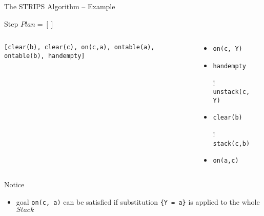 \documentclass[presentation]{beamer}\mode<presentation>{\usetheme{AMSBolognaFC}}
\begin{document}
\begin{frame}[c]{The STRIPS Algorithm -- Example}
\small

    \begin{exampleblock}{Step \nextStripsExampleStep{} \hfill $Plan = []$}
        \begin{columns}[t]
            \begin{column}{.30\linewidth}\centering
                \texttt{[clear(b), clear(c), \alert{on(c,a)}, ontable(a), ontable(b), handempty]}
            \end{column}
            \begin{column}{.50\linewidth}\centering
                \begin{itemize}
                    \item \alert{\texttt{on(c, Y)}}
                    \item \texttt{handempty}
                    \item[!] \texttt{unstack(c, Y)}
                    \item \texttt{clear(b)}
                    \item[!] \texttt{stack(c,b)}
                    \item \texttt{on(a,c)}
                \end{itemize}
            \end{column}
            \begin{column}{.10\linewidth}\centering
                
            \end{column}
        \end{columns}
    \end{exampleblock}

    \vfill

    \footnotesize
    Notice
    \begin{itemize}\tiny
        \item goal \texttt{on(c, a)} can be satisfied if substitution \texttt{\{Y = a\}} is applied to the whole $Stack$
    \end{itemize}

\end{frame}
\end{document}
